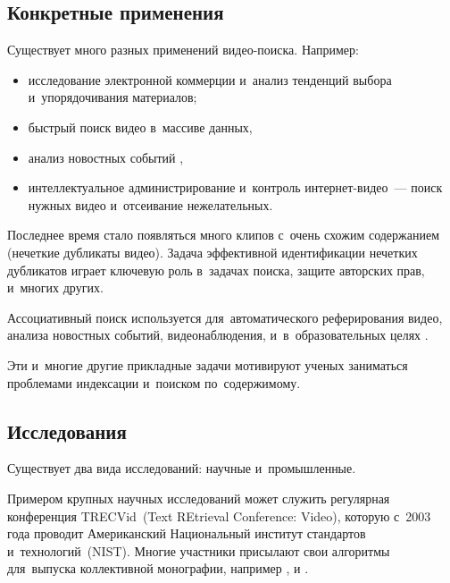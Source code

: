 \subsection{Конкретные применения}

Существует много разных применений видео-поиска. Например:
\begin{itemize}
    \item исследование электронной коммерции
        и~анализ тенденций выбора и~упорядочивания материалов;
    \item быстрый поиск видео в~массиве данных,
    \item анализ новостных событий \cite{Peng:2005},
    \item интеллектуальное администрирование и~контроль интернет-видео~—
        поиск нужных видео и~отсеивание нежелательных.
\end{itemize}

Последнее время стало появляться много клипов
с~очень схожим содержанием (нечеткие дубликаты видео).
Задача эффективной идентификации нечетких дубликатов играет ключевую
роль в~задачах поиска, защите авторских прав, и~многих других.

Ассоциативный поиск используется для~автоматического
реферирования видео, анализа новостных событий,
видеонаблюдения, и~в~образовательных целях \cite{Dimitrova:2002}.

Эти и~многие другие прикладные задачи мотивируют ученых заниматься
проблемами индексации и~поиском по~содержимому.

\subsection{Исследования}

Существует два вида исследований: научные и~промышленные.

Примером крупных научных исследований может служить
регулярная конференция TRECVid~(Text REtrieval Conference: Video),
которую с~2003 года проводит Американский Национальный институт
стандартов и~технологий~(NIST).
Многие участники присылают свои алгоритмы для~выпуска коллективной монографии,
например \cite{Over:2011}, \cite{Awad:2014} и \cite{Smeaton:2010}.


